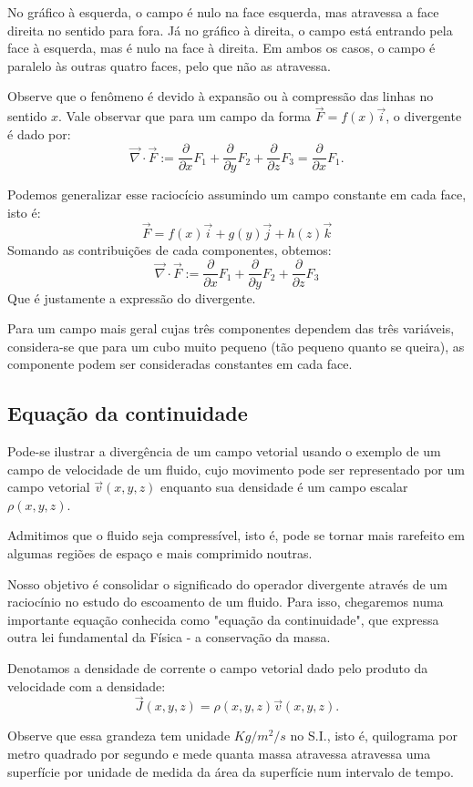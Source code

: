 No gráfico à esquerda, o campo é nulo na face esquerda, mas atravessa a face direita no sentido para fora. Já no gráfico à direita, o campo está entrando pela face à esquerda, mas é nulo na face à direita. Em ambos os casos, o campo é paralelo às outras quatro faces, pelo que não as atravessa.

Observe que o fenômeno é devido à expansão ou à compressão das linhas no sentido $x$. Vale observar que para um campo da forma $\vec{F}=f(x)\vec{i}$, o divergente é dado por:
$$\vec{\nabla}\cdot \vec{F} := \frac{\partial}{\partial x} F_1+ \frac{\partial}{\partial y} F_2+\frac{\partial}{\partial z} F_3 =\frac{\partial}{\partial x} F_1.$$

Podemos generalizar esse raciocício assumindo um campo constante em cada face, isto é:
$$\vec{F} = f(x)\vec{i} + g(y)\vec{j} + h(z)\vec{k}$$
Somando as contribuições de cada  componentes, obtemos:
$$\vec{\nabla}\cdot \vec{F} := \frac{\partial}{\partial x} F_1+ \frac{\partial}{\partial y} F_2+\frac{\partial}{\partial z} F_3$$
Que é justamente a expressão do divergente.

Para um campo mais geral cujas três componentes dependem das três variáveis, considera-se que para um cubo muito pequeno (tão pequeno quanto se queira), as componente podem ser consideradas constantes em cada face.


\subsection{Equação da continuidade}
Pode-se ilustrar a divergência de um campo vetorial usando o exemplo de um campo de velocidade de um fluido, cujo movimento pode ser representado por um campo vetorial $\vec{v}(x, y, z)$ enquanto sua densidade é um campo escalar $\rho(x, y, z)$.

Admitimos que o fluido seja compressível, isto é, pode se tornar mais rarefeito em algumas regiões de espaço e mais comprimido noutras.

Nosso objetivo é consolidar o significado do operador divergente através de um raciocínio no estudo do escoamento de um fluido. Para isso, chegaremos numa importante equação conhecida como "equação da continuidade", que expressa outra lei fundamental da Física - a conservação da massa. 

Denotamos a densidade de corrente o campo vetorial dado pelo produto da velocidade com a densidade: 
$$\vec{J}(x, y, z) = \rho(x, y, z)\vec{v}(x, y, z).$$

Observe que essa grandeza tem unidade $Kg/m^2/s$ no S.I., isto é, quilograma por metro quadrado por segundo e mede quanta massa atravessa atravessa uma superfície por unidade de medida da área da superfície num intervalo de tempo.




